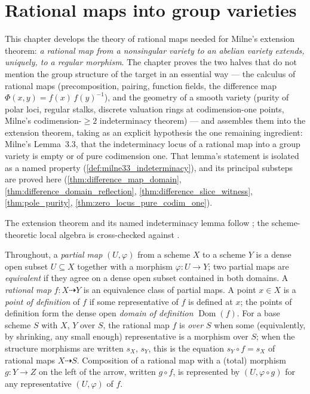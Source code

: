 \chapter{Rational maps into group varieties}
\label{chap:Albanese}

This chapter develops the theory of rational maps needed for Milne's extension
theorem: \emph{a rational map from a nonsingular variety to an abelian variety
extends, uniquely, to a regular morphism}. The chapter proves the two halves that
do not mention the group structure of the target in an essential way --- the
calculus of rational maps (precomposition, pairing, function fields, the
difference map \(\Phi(x,y) = f(x)\,f(y)^{-1}\)), and the geometry of a smooth
variety (purity of polar loci, regular stalks, discrete valuation rings at
codimension-one points, Milne's codimension-\(\geq 2\) indeterminacy theorem) ---
and assembles them into the extension theorem, taking as an explicit hypothesis
the one remaining ingredient: Milne's Lemma~3.3, that the indeterminacy locus of
a rational map into a group variety is empty or of pure codimension one. That
lemma's statement is isolated as a named property
(\ref{def:milne33_indeterminacy}), and its principal substeps are proved here
(\ref{thm:difference_map_domain}, \ref{thm:difference_domain_reflection},
\ref{thm:difference_slice_witness}, \ref{thm:pole_purity},
\ref{thm:zero_locus_pure_codim_one}).

The extension theorem and its named indeterminacy lemma follow \cite{milne-av}; the
scheme-theoretic local algebra is cross-checked against \cite{stacks-project}.

Throughout, a \emph{partial map} \((U, \varphi)\) from a scheme \(X\) to a scheme
\(Y\) is a dense open subset \(U \subseteq X\) together with a morphism
\(\varphi : U \to Y\); two partial maps are \emph{equivalent} if they agree on a
dense open subset contained in both domains. A \emph{rational map}
\(f : X \dashrightarrow Y\) is an equivalence class of partial maps. A point
\(x \in X\) is a \emph{point of definition} of \(f\) if some representative of
\(f\) is defined at \(x\); the points of definition form the dense open
\emph{domain of definition} \(\operatorname{Dom}(f)\). For a base scheme \(S\)
with \(X\), \(Y\) over \(S\), the rational map \(f\) is \emph{over \(S\)} when
some (equivalently, by shrinking, any small enough) representative is a morphism
over \(S\); when the structure morphisms are written \(s_X\), \(s_Y\), this is
the equation \(s_Y \circ f = s_X\) of rational maps \(X \dashrightarrow S\).
Composition of a rational map with a (total) morphism \(g : Y \to Z\) on the
left of the arrow, written \(g \circ f\), is represented by \((U, \varphi
\circ g)\) for any representative \((U, \varphi)\) of \(f\).

